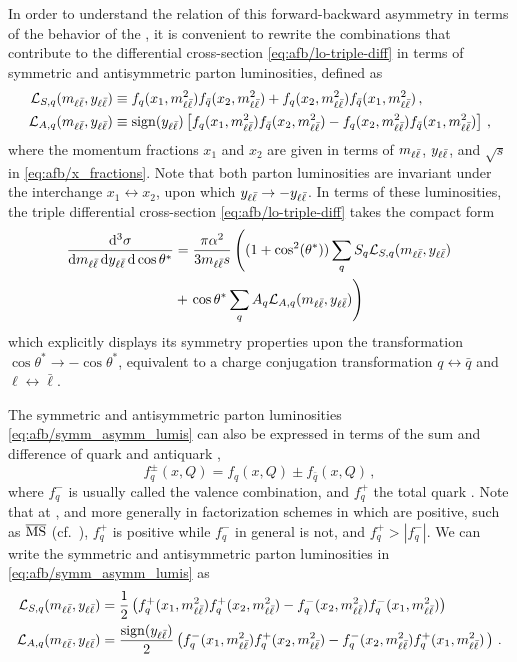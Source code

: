 In order to understand the relation of this forward-backward
asymmetry in terms of the
behavior of the \pdfs, it is convenient
to rewrite the \pdf combinations that contribute to the differential
cross-section \cref{eq:afb/lo-triple-diff} in terms of symmetric and
antisymmetric parton luminosities, defined as
\begin{align}
  \mathcal{L}_{S,q}(m_{\ell\bar{\ell}}, y_{\ell\bar{\ell}}) &\equiv f_q(x_1,m_{\ell\bar{\ell}}^2) f_{\bar{q}}(x_2,m_{\ell\bar{\ell}}^2) + f_q(x_2,m_{\ell\bar{\ell}}^2) f_{\bar{q}}(x_1,m_{\ell\bar{\ell}}^2) \, ,
  \nonumber\\
  \mathcal{L}_{A,q}(m_{\ell\bar{\ell}}, y_{\ell\bar{\ell}}) &\equiv \operatorname{sign} (y_{\ell\bar{\ell}}) \left[ f_q(x_1,m_{\ell\bar{\ell}}^2) f_{\bar{q}}(x_2,m_{\ell\bar{\ell}}^2) - f_q(x_2,m_{\ell\bar{\ell}}^2) f_{\bar{q}}(x_1,m_{\ell\bar{\ell}}^2)\right] \, , \label{eq:afb/symm_asymm_lumis}
\end{align}
where the momentum fractions $x_1$ and $x_2$ are given in terms of $m_{\ell\bar{\ell}}$, $y_{\ell\bar{\ell}}$,
and $\sqrt{s}$ in \cref{eq:afb/x_fractions}.
Note that both parton luminosities are invariant under
the interchange $x_1\leftrightarrow x_2$, upon which $y_{\ell\bar{\ell}} \to -y_{\ell\bar{\ell}}$.
%
In terms of these luminosities, the triple differential cross-section
\cref{eq:afb/lo-triple-diff} takes the compact form
\begin{align}
  \frac{\dd^3 \sigma}{\dd m_{\ell\bar{\ell}} \, \dd y_{\ell\bar{\ell}} \, \dd\cos\theta^*} &=
  \frac{\pi \alpha^2}{3 m_{\ell\bar{\ell}} s} \left(
  (1+\cos^2({\theta^*})) \sum_q S_q \mathcal{L}_{S,q}(m_{\ell\bar{\ell}}, y_{\ell\bar{\ell}}) \right. \nonumber\\
  &+ \left. \cos\theta^* \sum_q A_q \mathcal{L}_{A,q}(m_{\ell\bar{\ell}}, y_{\ell\bar{\ell}})  \right)
  \label{eq:afb/lo-triple-diff-lumis}
\end{align}
which explicitly displays
its symmetry properties upon the transformation $\cos\theta^* \to -\cos\theta^*$,
equivalent to a charge conjugation transformation 
$q\leftrightarrow \bar q$ and $\ell \leftrightarrow \bar{\ell} $.

The symmetric and antisymmetric parton luminosities \cref{eq:afb/symm_asymm_lumis} can also be expressed
in terms of the sum and difference of quark and antiquark \pdfs,
\begin{equation}
  \label{eq:afb/fqpm}
  f_{q}^\pm \left( x, Q\right) = f_{q} \left( x, Q\right) \pm f_{\bar{q}} \left( x, Q\right) \, ,
\end{equation}
where $f_{q}^-$ is usually called the valence \pdf combination, and $f_{q}^+$
the total quark \pdf\@. Note that at \lo, and more generally in factorization
schemes in which \pdfs are positive, such as ${\overline{\textrm{MS}}}$ (cf.\
\cite{Candido:2020yat}), $f^+_q$ is positive while $f_q^-$ in general is not,
and $f_{q}^+>|f_{q}^-|$.
%
We can write the symmetric and antisymmetric parton luminosities in
\cref{eq:afb/symm_asymm_lumis} as
\begin{align}
  \mathcal{L}_{S,q}(m_{\ell\bar{\ell}}, y_{\ell\bar{\ell}}) &= \frac {1} 2 \left( f_q^+(x_1,m_{\ell\bar{\ell}}^2) f_{q}^+(x_2,m_{\ell\bar{\ell}}^2) - f_q^-(x_2,m_{\ell\bar{\ell}}^2) f_{q}^-(x_1,m_{\ell\bar{\ell}}^2)  \right) \, \label{eq:afb/lumiss_qpm}\\
  \mathcal{L}_{A,q}(m_{\ell\bar{\ell}}, y_{\ell\bar{\ell}}) &= \frac {\operatorname{sign} (y_{\ell\bar{\ell}})} 2 \left( f_q^-(x_1,m_{\ell\bar{\ell}}^2) f_{q}^+(x_2,m_{\ell\bar{\ell}}^2) - f_q^-(x_2,m_{\ell\bar{\ell}}^2) f_{q}^+(x_1,m_{\ell\bar{\ell}}^2)  \, \right) \,. \label{eq:afb/lumisa_qpm}
\end{align}

